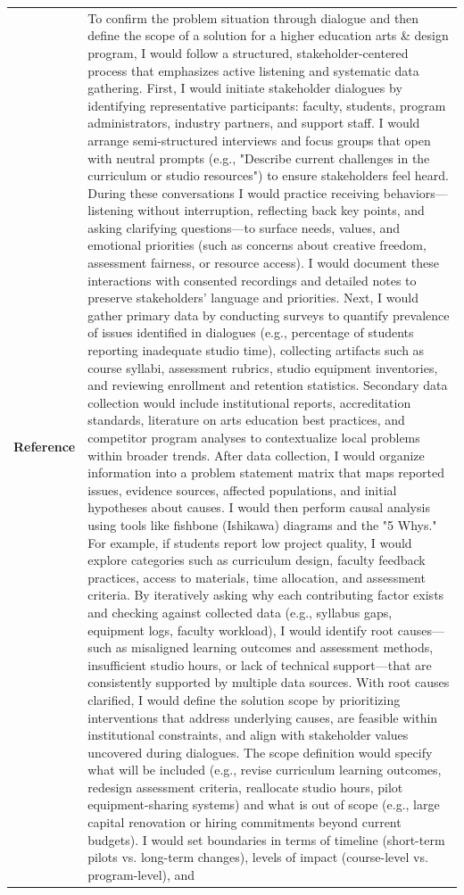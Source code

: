 \begin{longtable}{@{}l p{12.5cm}@{}}
  \textbf{Reference} & To confirm the problem situation through dialogue and then define the scope of a solution for a higher education arts \& design program, I would follow a structured, stakeholder-centered process that emphasizes active listening and systematic data gathering. First, I would initiate stakeholder dialogues by identifying representative participants: faculty, students, program administrators, industry partners, and support staff. I would arrange semi-structured interviews and focus groups that open with neutral prompts (e.g., "Describe current challenges in the curriculum or studio resources") to ensure stakeholders feel heard. During these conversations I would practice receiving behaviors---listening without interruption, reflecting back key points, and asking clarifying questions---to surface needs, values, and emotional priorities (such as concerns about creative freedom, assessment fairness, or resource access). I would document these interactions with consented recordings and detailed notes to preserve stakeholders' language and priorities. \newline Next, I would gather primary data by conducting surveys to quantify prevalence of issues identified in dialogues (e.g., percentage of students reporting inadequate studio time), collecting artifacts such as course syllabi, assessment rubrics, studio equipment inventories, and reviewing enrollment and retention statistics. Secondary data collection would include institutional reports, accreditation standards, literature on arts education best practices, and competitor program analyses to contextualize local problems within broader trends. \newline After data collection, I would organize information into a problem statement matrix that maps reported issues, evidence sources, affected populations, and initial hypotheses about causes. I would then perform causal analysis using tools like fishbone (Ishikawa) diagrams and the "5 Whys." For example, if students report low project quality, I would explore categories such as curriculum design, faculty feedback practices, access to materials, time allocation, and assessment criteria. By iteratively asking why each contributing factor exists and checking against collected data (e.g., syllabus gaps, equipment logs, faculty workload), I would identify root causes---such as misaligned learning outcomes and assessment methods, insufficient studio hours, or lack of technical support---that are consistently supported by multiple data sources. \newline With root causes clarified, I would define the solution scope by prioritizing interventions that address underlying causes, are feasible within institutional constraints, and align with stakeholder values uncovered during dialogues. The scope definition would specify what will be included (e.g., revise curriculum learning outcomes, redesign assessment criteria, reallocate studio hours, pilot equipment-sharing systems) and what is out of scope (e.g., large capital renovation or hiring commitments beyond current budgets). I would set boundaries in terms of timeline (short-term pilots vs. long-term changes), levels of impact (course-level vs. program-level), and 
\end{longtable}

